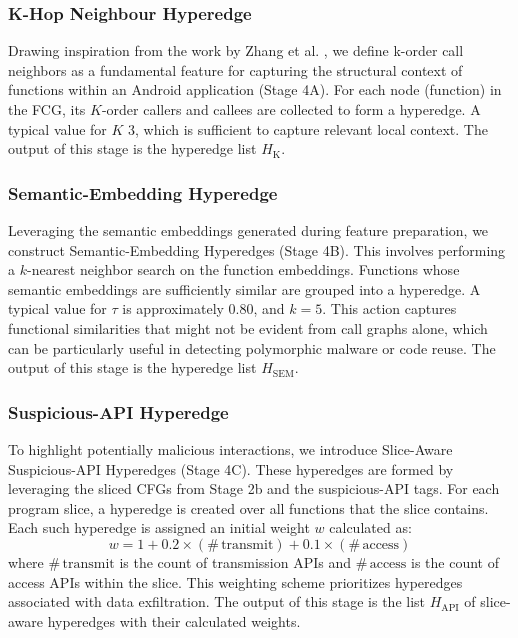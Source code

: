 \documentclass[runningheads]{llncs}
\begin{document}
\subsubsection{K-Hop Neighbour Hyperedge}
Drawing inspiration from the work by Zhang et al. \cite{zhang2023}, we define k-order call neighbors as a fundamental feature for capturing the structural context of functions within an Android application (Stage 4A). For each node (function) in the FCG, its $K$-order callers and callees are collected to form a hyperedge. A typical value for $K$ 3, which is sufficient to capture relevant local context. The output of this stage is the hyperedge list $H_{\mathrm{K}}$.

\subsubsection{Semantic-Embedding Hyperedge}
Leveraging the semantic embeddings generated during feature preparation, we construct Semantic-Embedding Hyperedges (Stage 4B). This involves performing a $k$-nearest neighbor search on the function embeddings. Functions whose semantic embeddings are sufficiently similar are grouped into a hyperedge. A typical value for $\tau$ is approximately 0.80, and $k=5$. 
This action captures functional similarities that might not be evident from call graphs alone, which can be particularly useful in detecting polymorphic malware or code reuse. The output of this stage is the hyperedge list $H_{\mathrm{SEM}}$.

\subsubsection{Suspicious-API Hyperedge}
To highlight potentially malicious interactions, we introduce Slice-Aware Suspicious-API Hyperedges (Stage 4C). These hyperedges are formed by leveraging the sliced CFGs from Stage 2b and the suspicious-API tags. For each program slice, a hyperedge is created over all functions that the slice contains. Each such hyperedge is assigned an initial weight $w$ calculated as:
$$
w = 1 + 0.2 \times (\#\,\text{transmit}) + 0.1 \times (\#\,\text{access})
$$
where $\#\,\text{transmit}$ is the count of transmission APIs and $\#\,\text{access}$ is the count of access APIs within the slice. This weighting scheme prioritizes hyperedges associated with data exfiltration. The output of this stage is the list $H_{\mathrm{API}}$ of slice-aware hyperedges with their calculated weights.
\end{document}
